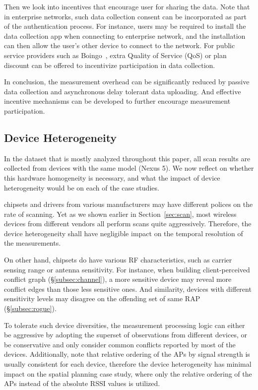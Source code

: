 Then we look into incentives that encourage user for sharing the data. Note that
in enterprise networks, such data collection consent can be incorporated as part
of the authentication process. For instance, users may be required to install
the data collection app when connecting to enterprise network, and the
installation can then allow the user's other device to connect to the network.
For public \wifi{} service providers such as Boingo~\cite{boingo}, extra Quality
of Service (QoS) or plan discount can be offered to incentivize participation in
data collection.

In conclusion, the measurement overhead can be significantly reduced by passive
data collection and asynchronous delay tolerant data uploading. And effective
incentive mechanisms can be developed to further encourage measurement
participation.

\subsection{Device Heterogeneity}
\label{subsec:heterogeneity}

In the \ubscan{} dataset that is mostly analyzed throughout this paper, all scan
results are collected from devices with the same model (Nexus 5). We now reflect
on whether this hardware homogeneity is necessary, and what the impact of device
heterogeneity would be on each of the case studies.

\wifi{} chipsets and drivers from various manufacturers may have different
polices on the rate of scanning. Yet as we shown earlier in
Section~\ref{sec:scan}, most wireless devices from different vendors all perform
\wifi{} scans quite aggressively.  Therefore, the device heterogeneity shall
have negligible impact on the temporal resolution of the measurements.

On other hand, \wifi{} chipsets do have various RF characteristics, such as
carrier sensing range or antenna sensitivity. For instance, when building
client-perceived conflict graph (\S\ref{subsec:channel}), a more sensitive
device may reveal more conflict edges than those less sensitive ones. And
similarity, devices with different sensitivity levels may disagree on the
offending set of same RAP (\S\ref{subsec:rogue}).

To tolerate such device diversities, the measurement processing logic can either
be aggressive by adopting the superset of observations from different devices, or
be conservative and only consider common conflicts reported by most of the
devices. Additionally, note that relative ordering of the APs by signal strength
is usually consistent for each device, therefore the device heterogeneity has
minimal impact on the spatial planning case study, where only the relative
ordering of the APs instead of the absolute RSSI values is utilized.
